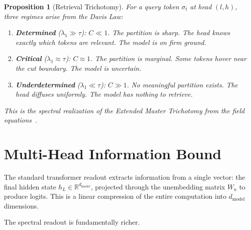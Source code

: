 \documentclass[11pt]{article}
\newtheorem{proposition}[definition]{Proposition}
\theoremstyle{remark}
\newcommand{\R}{\mathbb{R}}
\begin{document}
\begin{proposition}[Retrieval Trichotomy]\label{prop:trichotomy}
For a query token $\sigma_t$ at head $(l,h)$, three regimes 
arise from the Davis Law:
\begin{enumerate}[nosep]
  \item \textbf{Determined} ($\lambda_1 \gg \tau$): 
    $C \ll 1$. The partition is sharp. The head knows exactly 
    which tokens are relevant. 
    \emph{The model is on firm ground.}
  \item \textbf{Critical} ($\lambda_1 \approx \tau$): 
    $C \approx 1$. The partition is marginal. Some tokens 
    hover near the cut boundary. 
    \emph{The model is uncertain.}
  \item \textbf{Underdetermined} ($\lambda_1 \ll \tau$): 
    $C \gg 1$. No meaningful partition exists. The head 
    diffuses uniformly. 
    \emph{The model has nothing to retrieve.}
\end{enumerate}
This is the spectral realization of the Extended Master 
Trichotomy from the field equations~\cite{davis2026field}.
\end{proposition}


\section{Multi-Head Information Bound}
\label{sec:information_bound}

The standard transformer readout extracts information from 
a single vector: the final hidden state $h_L \in \R^{d_{\text{model}}}$, 
projected through the unembedding matrix $W_u$ to produce logits. 
This is a linear compression of the entire computation into 
$d_{\text{model}}$ dimensions.

The spectral readout is fundamentally richer.
\end{document}
